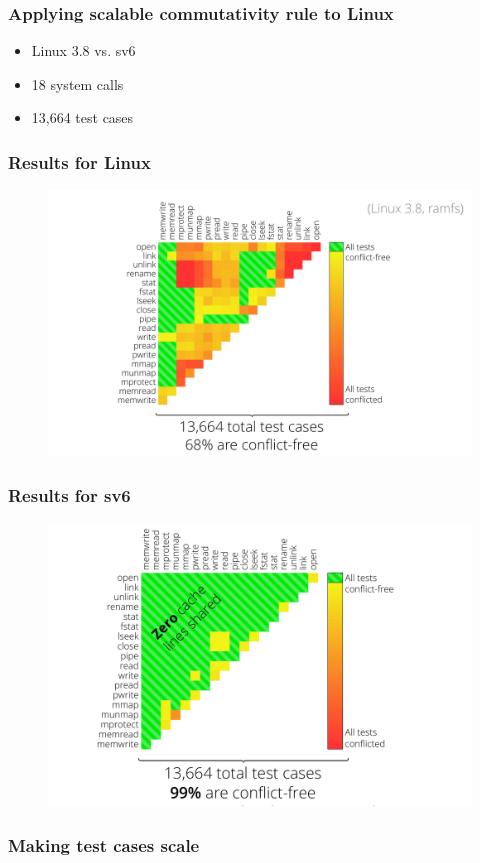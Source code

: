 \documentclass{beamer}
\begin{document}
\begin{frame}
\frametitle{Applying scalable commutativity rule to Linux}
\begin{itemize}
\item Linux 3.8 vs. sv6
\item 18 system calls
\item 13,664 test cases
\end{itemize}
\end{frame}

\begin{frame}
\frametitle{Results for Linux}
\begin{figure}
   \includegraphics[width=\textwidth]{799-s14-docs/linux_result.png}
 \end{figure}
\end{frame}

\begin{frame}
\frametitle{Results for sv6}
\begin{figure}
   \includegraphics[width=\textwidth]{799-s14-docs/sv6_result.png}
 \end{figure}
\end{frame}

\begin{frame}
\frametitle{Making test cases scale}

\end{frame}
\end{document}
